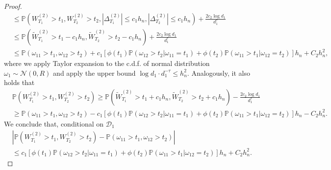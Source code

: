 \documentclass[12pt]{article}
\newcommand{\abs}[1]{\left\lvert#1\right\rvert}
\newcommand{\PP}{\mathbb{P}}
\newcommand{\cD}{\mathcal{D}}
\newcommand{\cN}{\mathcal{N}}
\def\PP{{\mathbb P}}
\theoremstyle{plain}
\begin{document}
\begin{proof}
\begin{equation*}
\begin{aligned}
    &\le  \PP(W^{(2)}_{T_1} >t_1, W^{(2)}_{T_2}>t_2,\abs{\Delta^{(2)}_{T_1}}\le c_1 h_n,\abs{\Delta^{(2)}_{T_2}}\le c_1 h_n  ) +\frac{2c_2 \log d_1}{d_1^\tau}\\ %
    &\le \PP(\widetilde{W}^{(2)}_{T_1} >t_1-c_1 h_n, \widetilde{W}^{(2)}_{T_2}>t_2-c_1 h_n) +\frac{2c_2 \log d_1}{d_1^\tau} \\
    &\le \PP(\omega_{11}>t_1,\omega_{12}>t_2 ) +c_1\left[\phi(t_1)\PP(\omega_{12}>t_2|\omega_{11}=t_1) +\phi(t_2)\PP(\omega_{11}>t_1|\omega_{12}=t_2)\right]h_n +C_2 h_n^2,
    \end{aligned}
\end{equation*}
where we apply Taylor expansion to the c.d.f. of normal distribution $\omega_1 \sim \cN(0,R)$ and apply the upper bound $\log d_1 \cdot d_1^{-\tau} \le h_n^2$. Analogously, it also holds that
\begin{equation*}
    \begin{aligned}
    &\PP(W^{(2)}_{T_1} >t_1, W^{(2)}_{T_2}>t_2)\ge \PP(\widetilde{W}^{(2)}_{T_1} >t_1+c_1 h_n, \widetilde{W}^{(2)}_{T_2}>t_2+c_1 h_n) -\frac{2c_2 \log d_1}{d_1^\tau} \\
    &\ge \PP(\omega_{11}>t_1,\omega_{12}>t_2 ) -c_1\left[\phi(t_1)\PP(\omega_{12}>t_2|\omega_{11}=t_1) +\phi(t_2)\PP(\omega_{11}>t_1|\omega_{12}=t_2)\right]h_n -C_2 h_n^2.
    \end{aligned}
\end{equation*}
We conclude that, conditional on $\cD_1$
\begin{equation*}
\begin{aligned}
&\abs{\PP(W^{(2)}_{T_1} >t_1, W^{(2)}_{T_2}>t_2 )-\PP(\omega_{11}>t_1,\omega_{12}>t_2 ) }\\
& \le c_1\left[\phi(t_1)\PP(\omega_{12}>t_2|\omega_{11}=t_1) +\phi(t_2)\PP(\omega_{11}>t_1|\omega_{12}=t_2)\right]h_n + C_2 h_n^2.
\end{aligned}
\end{equation*}



\end{proof}
\end{document}
